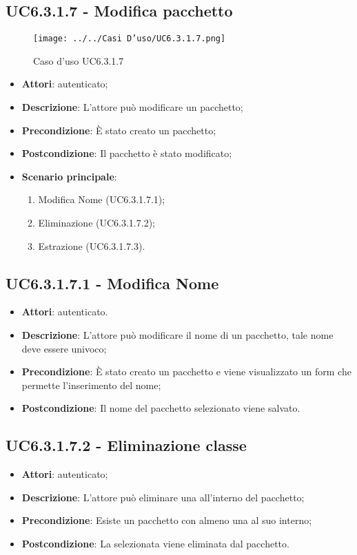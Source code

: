 \subsection{UC6.3.1.7 - Modifica pacchetto}
\label{ssec:UC6.3.1.7}
\begin{figure}[h!]
\centering
\texttt{[image: ../../Casi D'uso/UC6.3.1.7.png]}
\caption{Caso d'uso UC6.3.1.7}
 \end{figure}
\begin{itemize}
\item \textbf{Attori}:  autenticato;
\item \textbf{Descrizione}: L'attore può modificare un pacchetto;
\item \textbf{Precondizione}: È stato creato un pacchetto;
\item \textbf{Postcondizione}: Il pacchetto è stato modificato;
\item \textbf{Scenario principale}: \begin{enumerate}\item Modifica Nome (UC6.3.1.7.1);\item Eliminazione  (UC6.3.1.7.2);\item Estrazione  (UC6.3.1.7.3).
 \end{enumerate}
\end{itemize}
\subsection{UC6.3.1.7.1 - Modifica Nome}
\label{ssec:UC6.3.1.7.1}
\begin{itemize}
\item \textbf{Attori}:  autenticato.
\item \textbf{Descrizione}: L'attore può modificare il nome di un pacchetto, tale nome deve essere univoco;
\item \textbf{Precondizione}: È stato creato un pacchetto e viene visualizzato un form che permette l'inserimento del nome;
\item \textbf{Postcondizione}: Il nome del pacchetto selezionato viene salvato.
\end{itemize}
\subsection{UC6.3.1.7.2 - Eliminazione classe}
\label{ssec:UC6.3.1.7.2}
\begin{itemize}
\item \textbf{Attori}:  autenticato;
\item \textbf{Descrizione}: L'attore può eliminare una  all'interno del pacchetto;
\item \textbf{Precondizione}: Esiste un pacchetto con almeno una  al suo interno;
\item \textbf{Postcondizione}: La  selezionata viene eliminata dal pacchetto.
\end{itemize}
